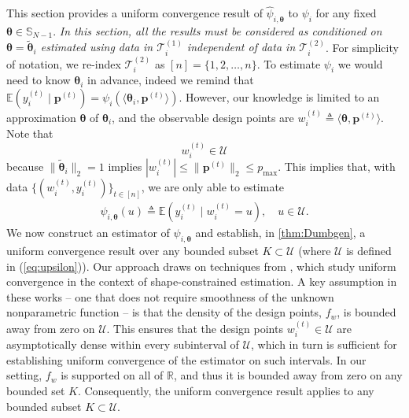 \documentclass{article} %
\def\eqref#1{equation~\ref{#1}}
\renewcommand{\eqref}[1]{(\ref{#1})}
\begin{document}
This section provides a uniform convergence result of $\widehat{\psi}_{i,\boldsymbol{\theta}}$ to $\psi_i$ for any fixed $\boldsymbol{\theta} \in \mathbb{S}_{N-1}$. \emph{In this section, all the results must be considered as conditioned on $\boldsymbol{\theta} = \widetilde{\boldsymbol{\theta}}_i$ estimated using data in $\mathcal{T}_i^{(1)}$ independent of data in $\mathcal{T}_i^{(2)}$}. For simplicity of notation, we re-index $\mathcal{T}_i^{(2)}$ as $[n]=\{1,2,\dots, n\}$. To estimate $\psi_i$ we would need to know $\boldsymbol{\theta}_i$ in advance, indeed we remind that $\mathbb{E}(y^{(t)}_i \mid \mathbf{p}^{(t)})= \psi_i(\langle\boldsymbol{\theta}_i,\mathbf{p}^{(t)}\rangle)$. %
However, our knowledge is limited to an approximation $\boldsymbol{\theta}$ of $\boldsymbol{\theta}_i$, and the observable design points are $w^{(t)}_i \triangleq \langle\boldsymbol{\theta},\mathbf{p}^{(t)}\rangle$. Note that 
$$
w_i^{(t)}\in \mathcal{U}
$$
because $\|\widetilde{\boldsymbol{\theta}}_i\|_2=1$ implies $|w_i^{(t)}|\leq \|\mathbf{p}^{(t)}\|_2\leq p_{\max}$. This implies that, with data $\{(w^{(t)}_i,y^{(t)}_i)\}_{t \in [n]}$, we are only able to estimate 
\begin{align}\label{def:psi_theta_i}
\psi_{i,\boldsymbol{\theta}}(u) \triangleq  \mathbb{E}(y^{(t)}_i \mid w^{(t)}_i=u), \quad u \in \mathcal{U}.
\end{align}
We now construct an estimator of $\psi_{i,\boldsymbol{\theta}}$ and establish, in \cref{thm:Dumbgen}, a uniform convergence result over any bounded subset $K \subset \mathcal{U}$ (where $\mathcal{U}$ is defined in \eqref{eq:upsilon}). Our approach draws on techniques from \cite{mosching2020monotone, dumbgen2004consistency}, which study uniform convergence in the context of shape-constrained estimation. A key assumption in these works -- one that does not require smoothness of the unknown nonparametric function -- is that the density of the design points, $f_w$, is bounded away from zero on $\mathcal{U}$. This ensures that the design points $w^{(t)}_i \in \mathcal{U}$ are asymptotically dense within every subinterval of $\mathcal{U}$, which in turn is sufficient for establishing uniform convergence of the estimator on such intervals. In our setting, $f_w$ is supported on all of $\mathbb{R}$, and thus it is bounded away from zero on any bounded set $K$. Consequently, the uniform convergence result applies to any bounded subset $K \subset \mathcal{U}$.
\end{document}
